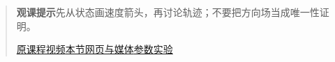 \begin{quote}\small\textbf{观课提示}\quad 先从状态画速度箭头，再讨论轨迹；不要把方向场当成唯一性证明。

\href{https://www.youtube.com/watch?v=p_di4Zn4wz4}{原课程视频}\quad\href{https://vitael04213.github.io/3blue1brown-notes/lessons/differential-equations.html}{本节网页与媒体}\quad\href{https://vitael04213.github.io/3blue1brown-notes/lab.html\#phase}{参数实验}
\end{quote}
